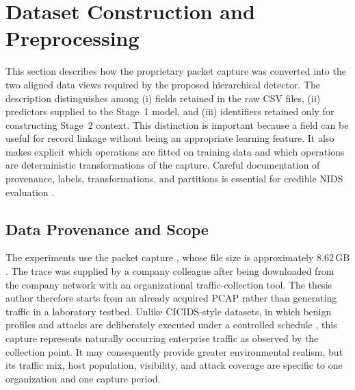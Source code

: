 %

\providecommand{\datasetfield}[1]{\texttt{\detokenize{#1}}}

\section{Dataset Construction and Preprocessing}
\label{sec:dataset_preprocessing}

This section describes how the proprietary packet capture was converted into
the two aligned data views required by the proposed hierarchical detector. The
description distinguishes among (i) fields retained in the raw CSV files,
(ii) predictors supplied to the Stage~1 model, and (iii) identifiers retained
only for constructing Stage~2 context. This distinction is important because a
field can be useful for record linkage without being an appropriate learning
feature. It also makes explicit which operations are fitted on training data
and which operations are deterministic transformations of the capture.
Careful documentation of provenance, labels, transformations, and partitions
is essential for credible NIDS evaluation
\cite{Shiravi2012DatasetGeneration,Ring2019Datasets,Goldschmidt2025Datasets,
Pinto2025DatasetReview}.

\subsection{Data Provenance and Scope}
\label{subsec:data_provenance}

The experiments use the packet capture
\datasetfield{ar002_et12_20260511_001.pcap}, whose file size is approximately
$8.62\,\mathrm{GB}$. The trace was supplied by a company colleague after being
downloaded from the company network with an organizational traffic-collection
tool. The thesis author therefore starts from an already acquired PCAP rather
than generating traffic in a laboratory testbed. Unlike CICIDS-style datasets,
in which benign profiles and attacks are deliberately executed under a
controlled schedule \cite{Sharafaldin2018CICIDS}, this capture represents
naturally occurring enterprise traffic as observed by the collection point.
It may consequently provide greater environmental realism, but its traffic
mix, host population, visibility, and attack coverage are specific to one
organization and one capture period.

